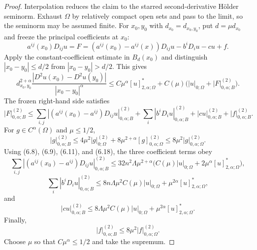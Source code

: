 \begin{proof}
\sketch Interpolation reduces the claim to the starred second-derivative
H\"older seminorm.  Exhaust $\Omega$ by relatively compact open sets and pass to
the limit, so the seminorm may be assumed finite.  For $x_0,y_0$ with
$d_{x_0}=d_{x_0,y_0}$, put $d=\mu d_{x_0}$ and freeze the principal
coefficients at $x_0$:
\begin{equation}\tag{6.15}
a^{ij}(x_0)D_{ij}u=F=(a^{ij}(x_0)-a^{ij}(x))D_{ij}u-b^iD_i u-cu+f.
\end{equation}
Apply the constant-coefficient estimate in $B_d(x_0)$ and distinguish
$|x_0-y_0|\le d/2$ from $|x_0-y_0|>d/2$. This gives
\begin{equation}
\tag{6.16}
d_{x_0,y_0}^{2+\alpha}\frac{|D^2u(x_0)-D^2u(y_0)|}{|x_0-y_0|^\alpha}
\le C\mu^\alpha [u]^*_{2,\alpha;\Omega}
+C(\mu)\bigl(|u|_{0;\Omega}+|F|_{0,\alpha;B}^{(2)}\bigr).
\end{equation}
The frozen right-hand side satisfies
\begin{equation}
\tag{6.17}
|F|_{0,\alpha;B}^{(2)}
\leq\sum_{i,j}|(a^{ij}(x_0)-a^{ij})D_{ij}u|_{0,\alpha;B}^{(2)}
+\sum_i|b^iD_i u|_{0,\alpha;B}^{(2)}+|cu|_{0,\alpha;B}^{(2)}
+|f|_{0,\alpha;B}^{(2)}.
\end{equation}
For $g\in C^\alpha(\Omega)$ and $\mu\le1/2$,
\begin{equation}
\tag{6.18}
|g|_{0,\alpha;B}^{(2)}
\leq4\mu^2|g|_{0;\Omega}^{(2)}
+8\mu^{2+\alpha}[g]_{0,\alpha;\Omega}^{(2)}
\leq8\mu^2|g|_{0,\alpha;\Omega}^{(2)}.
\end{equation}
Using (6.8), (6.9), (6.11), and (6.18), the three coefficient terms obey
\begin{equation}
\tag{6.19}
\sum_{i,j}|(a^{ij}(x_0)-a^{ij})D_{ij}u|_{0,\alpha;B}^{(2)}
\leq32n^2\Lambda\mu^{2+\alpha}
\bigl(C(\mu)|u|_{0;\Omega}+2\mu^\alpha[u]^*_{2,\alpha;\Omega}\bigr),
\end{equation}
\begin{equation}
\tag{6.20}
\sum_i|b^iD_i u|_{0,\alpha;B}^{(2)}
\leq8n\Lambda\mu^2C(\mu)|u|_{0;\Omega}
+\mu^{2\alpha}[u]^*_{2,\alpha;\Omega},
\end{equation}
and
\begin{equation}
\tag{6.21}
|cu|_{0,\alpha;B}^{(2)}
\leq8\Lambda\mu^2C(\mu)|u|_{0;\Omega}
+\mu^{2\alpha}[u]^*_{2,\alpha;\Omega}.
\end{equation}
Finally,
\begin{equation}
\tag{6.22}
|f|_{0,\alpha;B}^{(2)}
\leq8\mu^2|f|_{0,\alpha;\Omega}^{(2)}.
\end{equation}
Choose $\mu$ so that $C\mu^\alpha\le1/2$ and take the supremum.
\end{proof}

